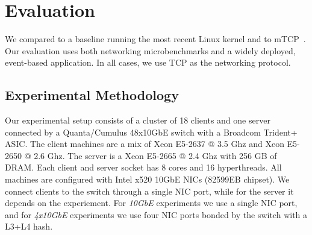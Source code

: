 
\section{Evaluation}
\label{sec:eval}


We compared \ix to a baseline running the most recent Linux kernel and
to mTCP~\cite{jeong2014mtcp}. Our evaluation uses both networking
microbenchmarks and a widely deployed, event-based application. In all
cases, we use TCP as the networking protocol.

\subsection{Experimental Methodology}
\label{sec:eval:setup}



 





Our experimental setup consists of a cluster of 18 clients
and one server connected by
a Quanta/Cumulus 48x10GbE switch with a Broadcom Trident+ ASIC.
The client machines are a mix of Xeon E5-2637 @ 3.5 Ghz and Xeon
E5-2650 @ 2.6 Ghz. The server is a Xeon E5-2665 @ 2.4 Ghz with
256 GB of DRAM.  Each client and server
socket has 8 cores and 16 hyperthreads. All machines are configured
with Intel x520 10GbE NICs (82599EB chipset). We connect clients
to the switch through a single NIC port, while for the server it depends
on the experiement. For \emph{10GbE} experiments we use a single
NIC port, and for \emph{4x10GbE} experiments we use four NIC ports
bonded by the switch with a L3+L4 hash.

